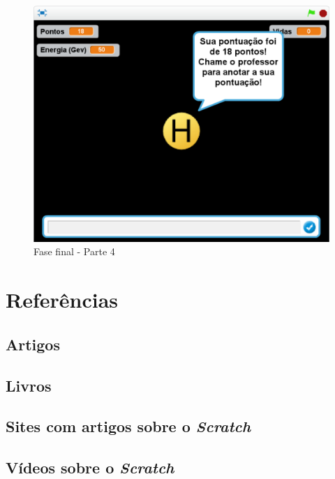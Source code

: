 \documentclass[12pt,fleqn]{book} %
\begin{document}
\begin{figure}[h]
	\centering
	\includegraphics[width=0.65 \textwidth]{Produto/final4}
	\caption{Fase final - Parte 4}
	\label{fig:app_a:final4}
\end{figure}




\chapter*{Referências}
\section*{Artigos}
\printbibliography[heading=bibempty,type=article]
\section*{Livros}
\printbibliography[heading=bibempty,type=book]
\section*{Sites com artigos sobre o \textit{Scratch}}
\printbibliography[heading=bibempty,keyword=site]
\section*{Vídeos sobre o \textit{Scratch}}
\printbibliography[heading=bibempty,keyword=video]
\end{document}
